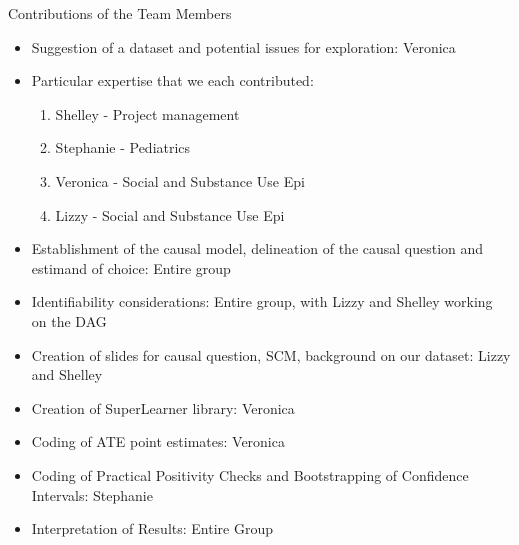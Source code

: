 \documentclass[ignorenonframetext,]{beamer}
\begin{document}
\begin{frame}{Contributions of the Team Members}

\begin{itemize}
\item
  Suggestion of a dataset and potential issues for exploration: Veronica
\item
  Particular expertise that we each contributed:

  \begin{enumerate}
   \item Shelley - Project management
   \item Stephanie - Pediatrics 
   \item Veronica - Social and Substance Use Epi
   \item Lizzy - Social and Substance Use Epi
     \end{enumerate}
\item
  Establishment of the causal model, delineation of the causal question
  and estimand of choice: Entire group
\item
  Identifiability considerations: Entire group, with Lizzy and Shelley
  working on the DAG
\item
  Creation of slides for causal question, SCM, background on our
  dataset: Lizzy and Shelley
\item
  Creation of SuperLearner library: Veronica
\item
  Coding of ATE point estimates: Veronica
\item
  Coding of Practical Positivity Checks and Bootstrapping of Confidence
  Intervals: Stephanie
\item
  Interpretation of Results: Entire Group
\end{itemize}

\end{frame}
\end{document}
